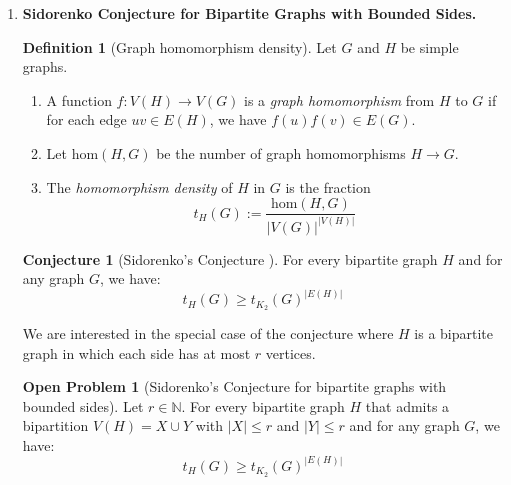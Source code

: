 \documentclass[12pt]{article}
\numberwithin{equation}{section}
\theoremstyle{definition}
\newtheorem{definition}{Definition}
\newtheorem{conjecture}[theorem]{Conjecture}
\newtheorem{openproblem}[theorem]{Open Problem}
\newcommand{\ev}[1]{( #1 )}
\newcommand{\N}{\mathbb{N}}
\begin{document}
\begin{enumerate}
\newpage
\item \textbf{Sidorenko Conjecture for Bipartite Graphs with Bounded Sides.} 

\begin{definition}[Graph homomorphism density]
Let $G$ and $H$ be simple graphs. 
\begin{enumerate}
\item A function $f: V\ev{H} \rightarrow V\ev{G}$ is a \textit{graph homomorphism} from $H$ to $G$ if for each edge $uv \in E\ev{H}$, we have $f\ev{u}f\ev{v} \in E\ev{G}$. 

\item Let $\mathrm{hom}\ev{H,G}$ be the number of graph homomorphisms $H \rightarrow G$. 

\item The \textit{homomorphism density} of $H$ in $G$ is the fraction
$$
t_{H}\ev{G} := \dfrac{\mathrm{hom}\ev{H,G}}{|V\ev{G}|^{|V\ev{H}|}}
$$
\end{enumerate}
\end{definition}

\begin{conjecture}[Sidorenko's Conjecture \mbox{\cite{sidorenko}}]
For every bipartite graph $H$ and for any graph $G$, we have:
$$
t_H\ev{G} \geq t_{K_2}\ev{G}^{|E\ev{H}|}
$$
\end{conjecture}

We are interested in the special case of the conjecture where $H$ is a bipartite graph in which each side has at most $r$ vertices.
\begin{openproblem}[Sidorenko's Conjecture for bipartite graphs with bounded sides]
Let $r \in \N$. For every bipartite graph $H$ that admits a bipartition $V\ev{H} = X \cup Y$ with $|X| \leq r$ and $|Y| \leq r$ and for any graph $G$, we have:
$$
t_H\ev{G} \geq t_{K_2}\ev{G}^{|E\ev{H}|}
$$
\end{openproblem}

\end{enumerate}
\end{document}
